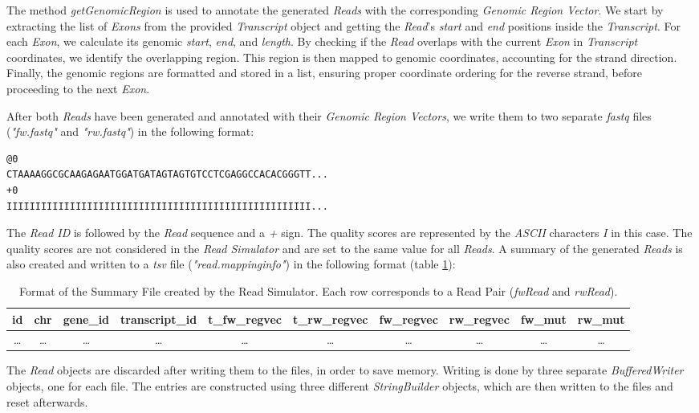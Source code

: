 \documentclass[12pt]{article}
\begin{document}
\begin{enumerate}
		The method \textit{getGenomicRegion} is used to annotate the generated \textit{Reads} with the corresponding \textit{Genomic Region Vector}.
		We start by extracting the list of \textit{Exons} from the provided \textit{Transcript} object and getting the
		\textit{Read}’s \textit{start} and \textit{end} positions inside the \textit{Transcript}. For each \textit{Exon}, we calculate its genomic \textit{start}, \textit{end}, and \textit{length}.
		By checking if the \textit{Read} overlaps with the current \textit{Exon} in \textit{Transcript} coordinates, we identify the overlapping region.
		This region is then mapped to genomic coordinates, accounting for the strand direction.
		Finally, the genomic regions are formatted and stored in a list, ensuring proper coordinate ordering for the reverse strand,
		before proceeding to the next \textit{Exon}.

		After both \textit{Reads} have been generated and annotated with their \textit{Genomic Region Vectors}, we write them to two separate \textit{fastq} files
		(\textit{"fw.fastq"} and \textit{"rw.fastq"}) in the following format:
		\begin{verbatim}
@0
CTAAAAGGCGCAAGAGAATGGATGATAGTAGTGTCCTCGAGGCCACACGGGTT...
+0
IIIIIIIIIIIIIIIIIIIIIIIIIIIIIIIIIIIIIIIIIIIIIIIIIIIII...
        \end{verbatim}\label{fastq}
		The \textit{Read ID} is followed by the \textit{Read} sequence and a \textit{+} sign. The quality scores are represented by the \textit{ASCII} characters
		\textit{I} in this case. The quality scores are not considered in the \textit{Read Simulator} and are set to the same value for all \textit{Reads}.
		A summary of the generated \textit{Reads} is also created and written to a \textit{tsv} file (\textit{"read.mappinginfo"}) in the following format (table \ref{tab:summary-format}):


		\setlength{\tabcolsep}{3pt}
		\begin{table}[htpb]
			\centering
			\caption{Format of the Summary File created by the Read Simulator. Each row corresponds to a Read Pair (\textit{fwRead} and \textit{rwRead}).}
			\label{tab:summary-format}
			\small
			\begin{tabular}{|c|c|c|c|c|c|c|c|c|c|}
				\hline
				id    & chr   & gene\_id & transcript\_id & t\_fw\_regvec & t\_rw\_regvec & fw\_regvec & rw\_regvec & fw\_mut & rw\_mut \\ \hline
				\dots & \dots & \dots    & \dots          & \dots         & \dots         & \dots      & \dots      & \dots   & \dots   \\
				\hline
			\end{tabular}
		\end{table}

		The \textit{Read} objects are discarded after writing them to the files, in order to save memory.
		Writing is done by three separate \textit{BufferedWriter} objects, one for each file.
		The entries are constructed using three different \textit{StringBuilder} objects, which are then written to the files and reset afterwards.

\end{enumerate}
\newpage
\end{document}
